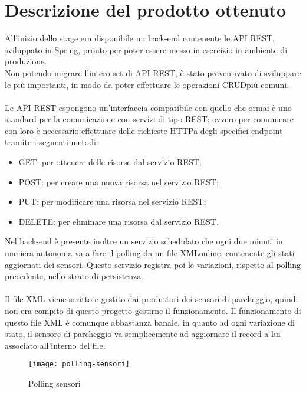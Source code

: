 \section{Descrizione del prodotto ottenuto}

All'inizio dello stage era disponibile un \gls{back-end} contenente le \gls{API} \gls{REST}, sviluppato in Spring, pronto per
poter essere messo in esercizio in ambiente di produzione.
\\
Non potendo migrare l'intero set di \gls{API} \gls{REST}, è stato preventivato di sviluppare
le più importanti, in modo da poter effettuare le operazioni \gls{CRUD}\glsfirstoccur più
comuni.
\\\\
Le \gls{API} \gls{REST} espongono un'interfaccia compatibile con quello che ormai è uno standard per la
comunicazione con servizi di tipo \gls{REST}; ovvero per comunicare con loro è necessario effettuare
delle richieste \gls{HTTP}\glsfirstoccur a degli specifici \gls{endpoint} tramite i seguenti metodi:
\begin{itemize}
    \item GET: per ottenere delle risorse dal servizio \gls{REST};
    \item POST: per creare una nuova risorsa nel servizio \gls{REST};
    \item PUT: per modificare una risorsa nel servizio \gls{REST};
    \item DELETE: per eliminare una risorsa dal servizio \gls{REST}.
\end{itemize}
\leavevmode\newline
Nel \gls{back-end} è presente inoltre un servizio schedulato che ogni due minuti in maniera autonoma va a fare il polling
da un file \gls{XML}\glsfirstoccur online, contenente gli stati aggiornati dei sensori. Questo servizio registra poi 
le variazioni, rispetto
al polling precedente, nello strato di persistenza.
\\\\
Il file \gls{XML} viene scritto e gestito dai produttori dei sensori di parcheggio, quindi non era compito di questo 
progetto gestirne il funzionamento. Il funzionamento di questo file \gls{XML} è comunque abbastanza banale,
in quanto ad ogni variazione di stato, il sensore di parcheggio va semplicemente ad aggiornare 
il record a lui associato
all'interno del file.
\\
\begin{figure}[H]
    \centering
    \texttt{[image: polling-sensori]}
    \caption{Polling sensori}
\end{figure}
\leavevmode\newline
